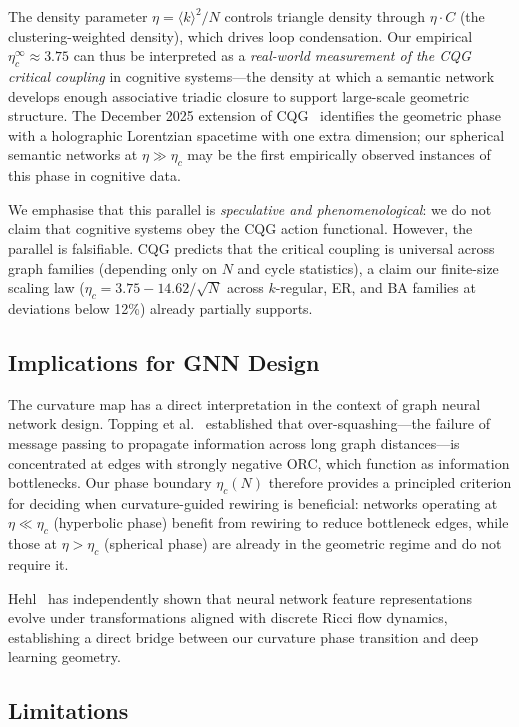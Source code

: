 \documentclass[11pt,a4paper]{article}
\newcommand{\kavg}{\langle k \rangle}
\newcommand{\etac}{\eta_c}
\begin{document}
The density parameter $\eta = \kavg^2/N$ controls triangle density through $\eta \cdot C$ (the clustering-weighted density), which drives loop condensation. Our empirical $\etac^\infty \approx 3.75$ can thus be interpreted as a \emph{real-world measurement of the CQG critical coupling} in cognitive systems---the density at which a semantic network develops enough associative triadic closure to support large-scale geometric structure. The December 2025 extension of CQG~\cite{trugenberger2025review} identifies the geometric phase with a holographic Lorentzian spacetime with one extra dimension; our spherical semantic networks at $\eta \gg \etac$ may be the first empirically observed instances of this phase in cognitive data.

We emphasise that this parallel is \emph{speculative and phenomenological}: we do not claim that cognitive systems obey the CQG action functional. However, the parallel is falsifiable. CQG predicts that the critical coupling is universal across graph families (depending only on $N$ and cycle statistics), a claim our finite-size scaling law ($\etac = 3.75 - 14.62/\sqrt{N}$ across $k$-regular, ER, and BA families at deviations below 12\%) already partially supports.

\subsection{Implications for GNN Design}

The curvature map has a direct interpretation in the context of graph neural network design. Topping et al.~\cite{topping2022over} established that over-squashing---the failure of message passing to propagate information across long graph distances---is concentrated at edges with strongly negative ORC, which function as information bottlenecks. Our phase boundary $\etac(N)$ therefore provides a principled criterion for deciding when curvature-guided rewiring is beneficial: networks operating at $\eta \ll \etac$ (hyperbolic phase) benefit from rewiring to reduce bottleneck edges, while those at $\eta > \etac$ (spherical phase) are already in the geometric regime and do not require it.

Hehl~\cite{hehl2025neural} has independently shown that neural network feature representations evolve under transformations aligned with discrete Ricci flow dynamics, establishing a direct bridge between our curvature phase transition and deep learning geometry.

\subsection{Limitations}
\end{document}
